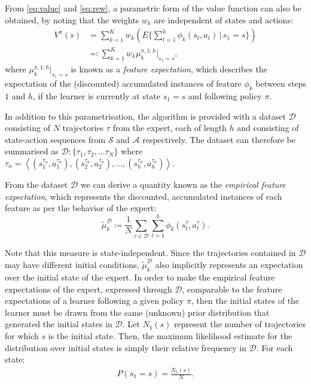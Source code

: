 \documentclass[letterpaper]{article}
\begin{document}
From \eqref{eq:value} and \eqref{eq:rew}, a parametric form of the value function can also be obtained, by noting that the weights $w_k$ are independent of states and actions:
\begin{align}
 	V^{\pi}(s) &= \sum^K_{k=1}w_k\left(E\{\sum_{t = 1}^h\phi_k(s_t,a_t)\,\vert\, s_1 = s\}\right)\\
&\eqqcolon\sum^K_{k=1}w_k\mu^{\pi, 1:h}_k|_{s_1=s},\label{eq:parametrized_value}
\end{align}
where $\mu^{\pi,1:h}_k|_{s_1=s}$ is known as a \emph{feature expectation}, which describes the expectation of the (discounted) accumulated instances of feature $\phi_k$ between steps $1$ and $h$, if the learner is currently at state $s_1 = s$ and following policy $\pi$.

In addition to this parametrisation, the algorithm is provided with a dataset ${\mathcal{D}}$ consisting of $N$ trajectories $\tau$ from the expert, each of length $h$ and consisting of state-action sequences from $\mathcal{S}$ and $\mathcal{A}$ respectively. The dataset can therefore be summarised as $\mathcal{D}:\big\{ \tau_1,\tau_2,...\tau_N \big\}$ where $\tau_n = \left<(s^{\tau_n}_1,a^{\tau_n}_1),(s^{\tau_n}_2,a^{\tau_n}_2),\ldots,(s^{\tau_n}_{h},a^{\tau_n}_{h})\right>$.

From the dataset ${\mathcal{D}}$ we can derive a quantity known as the \emph{empirical feature expectation}, which represents the discounted, accumulated instances of each feature as per the behavior of the expert:
\begin{equation}
	\widetilde{\mu}^{\mathcal{D}}_k \coloneqq\frac{1}{N}\sum_{\tau\in\mathcal{D}}\sum_{t=1}^{h}\phi_k(s^\tau_t,a^\tau_t). \label{eqn:empirical_fe}
\end{equation}

Note that this measure is state-independent. Since the trajectories contained in $\mathcal{D}$ may have different initial conditions, $\widetilde{\mu}^{\mathcal{D}}_k$ also implicitly represents an expectation over the initial state of the expert. In order to make the empirical feature expectations of the expert, expressed through $\mathcal{D}$, comparable to the feature expectations of a learner following a given policy $\pi$, then the initial states of the learner must be drawn from the same (unknown) prior distribution that generated the initial states in $\mathcal{D}$. Let $N_1(s)$ represent the number of trajectories for which $s$ is the initial state. Then, the maximum likelihood estimate for the distribution over initial states is simply their relative frequency in $\mathcal{D}$. For each state:
\begin{align}
  \label{eq:initial_belief}
  P(s_1 = s)= \frac{N_1(s)}{N}.
\end{align}
\end{document}
